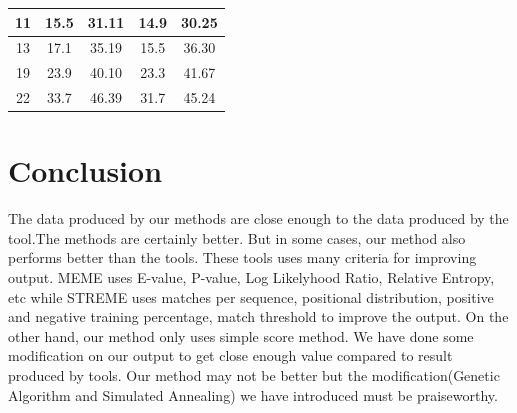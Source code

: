 \documentclass{article}
\begin{document}
\begin{Large}
\begin{table}[h]
\begin{tabular}{|c|cc|cc|}
11                                                                       & \multicolumn{1}{c|}{15.5}                                                    & 31.11                                                       & \multicolumn{1}{c|}{14.9}                                                    & 30.25                                                       \\ \hline
13                                                                       & \multicolumn{1}{c|}{17.1}                                                    & 35.19                                                       & \multicolumn{1}{c|}{15.5}                                                    & 36.30                                                       \\ \hline
19                                                                       & \multicolumn{1}{c|}{23.9}                                                    & 40.10                                                       & \multicolumn{1}{c|}{23.3}                                                    & 41.67                                                       \\ \hline
22                                                                       & \multicolumn{1}{c|}{33.7}                                                    & 46.39                                                       & \multicolumn{1}{c|}{31.7}                                                    & 45.24                                                       \\ \hline
\end{tabular}
\end{table}
\newpage
\section{Conclusion}
The data produced by our methods are close enough to the data produced by the tool.The methods are certainly better. But in some cases, our method also performs better than the tools. These tools uses many criteria for improving output. MEME uses E-value, P-value, Log Likelyhood Ratio, Relative Entropy, etc while STREME uses matches per sequence, positional distribution, positive and negative training percentage, match threshold to improve the output. On the other hand, our method only uses simple score method. We have done some modification on our output to get close enough value compared to result produced by tools. Our method may not be better but the modification(Genetic Algorithm and Simulated Annealing) we have introduced must be praiseworthy.\\


\end{Large}
\end{document}
